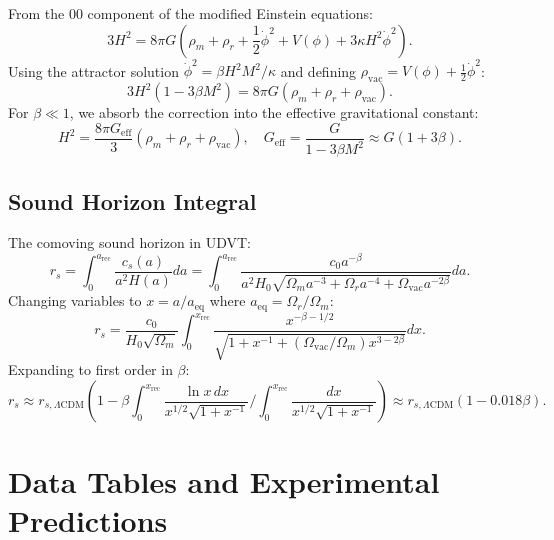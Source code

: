 \documentclass[12pt,a4paper]{book}
\theoremstyle{definition}
\theoremstyle{remark}
\begin{document}
From the 00 component of the modified Einstein equations:
\begin{equation}
    3H^2 = 8\pi G \left(\rho_m + \rho_r + \frac{1}{2}\dot{\phi}^2 + V(\phi) + 3\kappa H^2 \dot{\phi}^2\right).
\end{equation}
Using the attractor solution $\dot{\phi}^2 = \beta H^2 M^2/\kappa$ and defining $\rho_{\mathrm{vac}} = V(\phi) + \frac{1}{2}\dot{\phi}^2$:
\begin{equation}
    3H^2(1 - 3\beta M^2) = 8\pi G (\rho_m + \rho_r + \rho_{\mathrm{vac}}).
\end{equation}
For $\beta \ll 1$, we absorb the correction into the effective gravitational constant:
\begin{equation}
    H^2 = \frac{8\pi G_{\mathrm{eff}}}{3}(\rho_m + \rho_r + \rho_{\mathrm{vac}}), \quad G_{\mathrm{eff}} = \frac{G}{1 - 3\beta M^2} \approx G(1 + 3\beta).
\end{equation}

\section{Sound Horizon Integral}

The comoving sound horizon in UDVT:
\begin{equation}
    r_s = \int_0^{a_{\mathrm{rec}}} \frac{c_s(a)}{a^2 H(a)} da = \int_0^{a_{\mathrm{rec}}} \frac{c_0 a^{-\beta}}{a^2 H_0 \sqrt{\Omega_m a^{-3} + \Omega_r a^{-4} + \Omega_{\mathrm{vac}} a^{-2\beta}}} da.
\end{equation}
Changing variables to $x = a/a_{\mathrm{eq}}$ where $a_{\mathrm{eq}} = \Omega_r/\Omega_m$:
\begin{equation}
    r_s = \frac{c_0}{H_0 \sqrt{\Omega_m}} \int_0^{x_{\mathrm{rec}}} \frac{x^{-\beta - 1/2}}{\sqrt{1 + x^{-1} + (\Omega_{\mathrm{vac}}/\Omega_m)x^{3-2\beta}}} dx.
\end{equation}
Expanding to first order in $\beta$:
\begin{equation}
    r_s \approx r_{s,\Lambda\mathrm{CDM}} \left(1 - \beta \int_0^{x_{\mathrm{rec}}} \frac{\ln x \, dx}{x^{1/2}\sqrt{1+x^{-1}}} \Big/ \int_0^{x_{\mathrm{rec}}} \frac{dx}{x^{1/2}\sqrt{1+x^{-1}}}\right) \approx r_{s,\Lambda\mathrm{CDM}}(1 - 0.018\beta).
\end{equation}

\chapter{Data Tables and Experimental Predictions}
\label{app:data}
\end{document}
